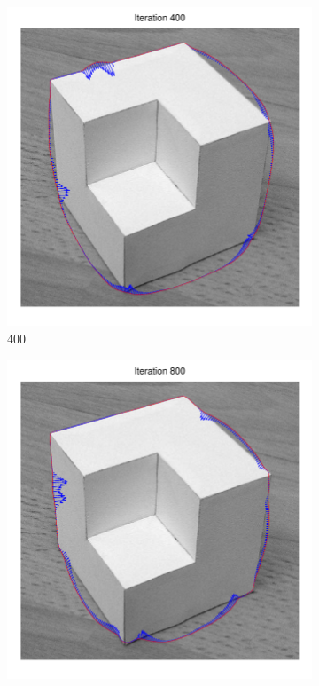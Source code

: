 \documentclass[11pt,a4paper]{article}
\begin{document}
\begin{figure}[H]
\begin{subfigure}[t]{0.48\textwidth}
        \includegraphics[width=\textwidth]{src/images/cubic_400.pdf}
        \caption{400}
        \label{fig:cubic_400}
    \end{subfigure}
    \begin{subfigure}[t]{0.48\textwidth}
        \includegraphics[width=\textwidth]{src/images/cubic_800.pdf}

\end{subfigure}
\end{figure}
\end{document}
